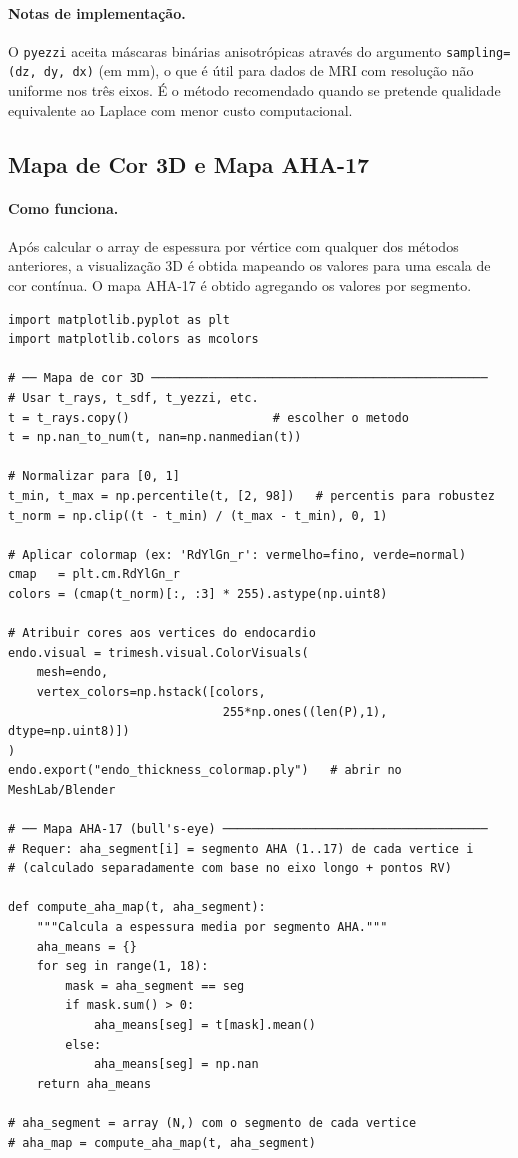 \paragraph{Notas de implementação.}
O \texttt{pyezzi} aceita máscaras binárias anisotrópicas através
do argumento \texttt{sampling=(dz, dy, dx)} (em mm), o que é
útil para dados de MRI com resolução não uniforme nos três eixos.
É o método recomendado quando se pretende qualidade equivalente
ao Laplace com menor custo computacional.

\subsection{Mapa de Cor 3D e Mapa AHA-17}
\label{impl:colormap}

\paragraph{Como funciona.}
Após calcular o array de espessura por vértice com qualquer
dos métodos anteriores, a visualização 3D é obtida mapeando
os valores para uma escala de cor contínua. O mapa AHA-17
é obtido agregando os valores por segmento.

\begin{lstlisting}
import matplotlib.pyplot as plt
import matplotlib.colors as mcolors

# ── Mapa de cor 3D ───────────────────────────────────────────────
# Usar t_rays, t_sdf, t_yezzi, etc.
t = t_rays.copy()                    # escolher o metodo
t = np.nan_to_num(t, nan=np.nanmedian(t))

# Normalizar para [0, 1]
t_min, t_max = np.percentile(t, [2, 98])   # percentis para robustez
t_norm = np.clip((t - t_min) / (t_max - t_min), 0, 1)

# Aplicar colormap (ex: 'RdYlGn_r': vermelho=fino, verde=normal)
cmap   = plt.cm.RdYlGn_r
colors = (cmap(t_norm)[:, :3] * 255).astype(np.uint8)

# Atribuir cores aos vertices do endocardio
endo.visual = trimesh.visual.ColorVisuals(
    mesh=endo,
    vertex_colors=np.hstack([colors,
                              255*np.ones((len(P),1), dtype=np.uint8)])
)
endo.export("endo_thickness_colormap.ply")   # abrir no MeshLab/Blender

# ── Mapa AHA-17 (bull's-eye) ─────────────────────────────────────
# Requer: aha_segment[i] = segmento AHA (1..17) de cada vertice i
# (calculado separadamente com base no eixo longo + pontos RV)

def compute_aha_map(t, aha_segment):
    """Calcula a espessura media por segmento AHA."""
    aha_means = {}
    for seg in range(1, 18):
        mask = aha_segment == seg
        if mask.sum() > 0:
            aha_means[seg] = t[mask].mean()
        else:
            aha_means[seg] = np.nan
    return aha_means

# aha_segment = array (N,) com o segmento de cada vertice
# aha_map = compute_aha_map(t, aha_segment)
\end{lstlisting}

